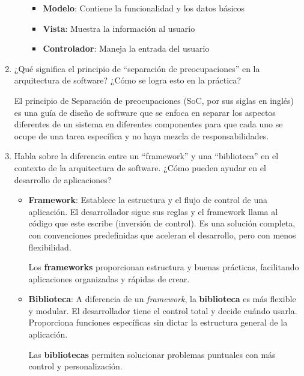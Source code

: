 \begin{enumerate}
\begin{itemize}
					\begin{itemize}
						\item \textbf{Modelo}: Contiene la funcionalidad y los datos
							básicos

						\item \textbf{Vista}: Muestra la información al usuario

						\item \textbf{Controlador}: Maneja la entrada del usuario
					\end{itemize}
			\end{itemize}

		\item ¿Qué significa el principio de ``separación de preocupaciones''
			en la arquitectura de software? ¿Cómo se logra esto en la
			práctica?

			El principio de Separación de preocupaciones (SoC, por sus
			siglas en inglés) es una guía de diseño de software que se enfoca
			en separar los aspectos diferentes de un sistema en diferentes componentes
			para que cada uno se ocupe de una tarea específica y no haya mezcla
			de responsabilidades.

		\item Habla sobre la diferencia entre un ``framework'' y una ``biblioteca''
			en el contexto de la arquitectura de software. ¿Cómo pueden
			ayudar en el desarrollo de aplicaciones?

			\begin{itemize}
				\item \textbf{Framework}: Establece la estructura y el flujo de
					control de una aplicación. El desarrollador sigue sus
					reglas y el framework llama al código que este escribe (inversión
					de control). Es una solución completa, con convenciones
					predefinidas que aceleran el desarrollo, pero con menos flexibilidad.

					Los \textbf{frameworks} proporcionan estructura y buenas
					prácticas, facilitando aplicaciones organizadas y rápidas de
					crear.

				\item \textbf{Biblioteca}: A diferencia de un \emph{framework},
					la \textbf{biblioteca} es más flexible y modular. El desarrollador
					tiene el control total y decide cuándo usarla. Proporciona
					funciones específicas sin dictar la estructura general de
					la aplicación.

					Las \textbf{bibliotecas} permiten solucionar problemas puntuales
					con más control y personalización.
			\end{itemize}
	\end{enumerate}

